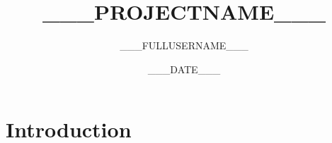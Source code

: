 \documentclass{article}
\title{___PROJECTNAME___}
\author{___FULLUSERNAME___}
\date{___DATE___}
\begin{document}
    \maketitle

    \section{Introduction}
\end{document}
